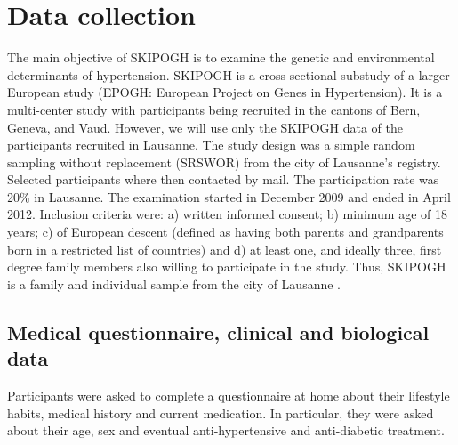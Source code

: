 
\section{Data collection}
The main objective of SKIPOGH is to examine the genetic and environmental determinants of hypertension. SKIPOGH is a cross-sectional substudy of a larger European study (EPOGH: European Project on Genes in Hypertension). It is a multi-center study with participants being recruited in the cantons of Bern, Geneva, and Vaud. However, we will use only the SKIPOGH data of the participants recruited in Lausanne. The study design was a simple random sampling without replacement (SRSWOR) from the city of Lausanne's registry. Selected participants where then contacted by mail. The participation rate was 20\% in Lausanne. The examination started in December 2009 and ended in April 2012. Inclusion criteria were: a) written informed consent; b) minimum age of 18 years; c) of European descent (defined as having both parents and grandparents born in a restricted list of countries) and d) at least one, and ideally three, first degree family members also willing to participate in the study. Thus, SKIPOGH is a family and individual sample from the city of Lausanne \cite{alwan_epidemiology_2014}.


\subsection{Medical questionnaire, clinical and biological data}
Participants were asked to complete a questionnaire at home about their lifestyle habits, medical history and current medication. In particular, they were asked about their age, sex and eventual anti-hypertensive and anti-diabetic treatment.

